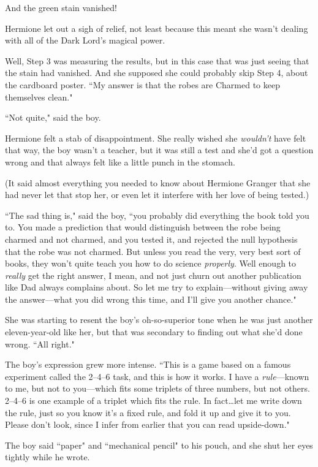 And the green stain vanished!

Hermione let out a sigh of relief, not least because this meant she wasn't dealing with all of the Dark Lord's magical power.

Well, Step 3 was measuring the results, but in this case that was just seeing that the stain had vanished. And she supposed she could probably skip Step 4, about the cardboard poster. ``My answer is that the robes are Charmed to keep themselves clean."

``Not quite," said the boy.

Hermione felt a stab of disappointment. She really wished she \emph{wouldn't} have felt that way, the boy wasn't a teacher, but it was still a test and she'd got a question wrong and that always felt like a little punch in the stomach.

(It said almost everything you needed to know about Hermione Granger that she had never let that stop her, or even let it interfere with her love of being tested.)

``The sad thing is," said the boy, ``you probably did everything the book told you to. You made a prediction that would distinguish between the robe being charmed and not charmed, and you tested it, and rejected the null hypothesis that the robe was not charmed. But unless you read the very, very best sort of books, they won't quite teach you how to do science \emph{properly}. Well enough to \emph{really} get the right answer, I mean, and not just churn out another publication like Dad always complains about. So let me try to explain—without giving away the answer—what you did wrong this time, and I'll give you another chance."

She was starting to resent the boy's oh-so-superior tone when he was just another eleven-year-old like her, but that was secondary to finding out what she'd done wrong. ``All right."

The boy's expression grew more intense. ``This is a game based on a famous experiment called the 2--4--6 task, and this is how it works. I have a \emph{rule}—known to me, but not to you—which fits some triplets of three numbers, but not others. 2--4--6 is one example of a triplet which fits the rule. In fact…let me write down the rule, just so you know it's a fixed rule, and fold it up and give it to you. Please don't look, since I infer from earlier that you can read upside-down."

The boy said ``paper" and ``mechanical pencil" to his pouch, and she shut her eyes tightly while he wrote.

